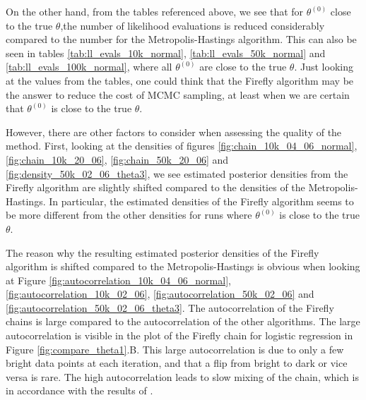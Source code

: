On the other hand, from the tables referenced above, we see that for $\theta^{\left(0\right)}$ close to the true $\theta$,the number of likelihood evaluations is reduced considerably compared to the number for the Metropolis-Hastings algorithm. 
This can also be seen in tables \ref{tab:ll_evals_10k_normal}, \ref{tab:ll_evals_50k_normal} and \ref{tab:ll_evals_100k_normal}, where all $\theta^{\left(0\right)}$ are close to the true $\theta$. Just looking at the values from the tables, one could think that the Firefly algorithm may be the answer to reduce the cost of MCMC sampling, at least when we are certain that $\theta^{\left(0\right)}$ is close to the true $\theta$. 

However, there are other factors to consider when assessing the quality of the method. First, looking at the densities of figures \ref{fig:chain_10k_04_06_normal}, \ref{fig:chain_10k_20_06}, \ref{fig:chain_50k_20_06} and \ref{fig:density_50k_02_06_theta3}, we see estimated posterior densities from the Firefly algorithm are slightly shifted compared to the densities of the Metropolis-Hastings.
In particular, the estimated densities of the Firefly algorithm seems to be more different from the other densities for runs where $\theta^{\left(0\right)}$ is close to the true $\theta$. 

The reason why the resulting estimated posterior densities of the Firefly algorithm is shifted compared to the Metropolis-Hastings is obvious when looking at Figure
\ref{fig:autocorrelation_10k_04_06_normal}, \ref{fig:autocorrelation_10k_02_06}, \ref{fig:autocorrelation_50k_02_06} and  \ref{fig:autocorrelation_50k_02_06_theta3}. The autocorrelation of the Firefly chains is large compared to the autocorrelation of the other algorithms. The large autocorrelation is visible in the plot of the Firefly chain for logistic regression in Figure \ref{fig:compare_theta1}.B. This large autocorrelation is due to only a few bright data points at each iteration, and that a flip from bright to dark or vice versa is rare. The high autocorrelation leads to slow mixing of the chain, which is in accordance with the results of \cite{Bardenet:1}.  

